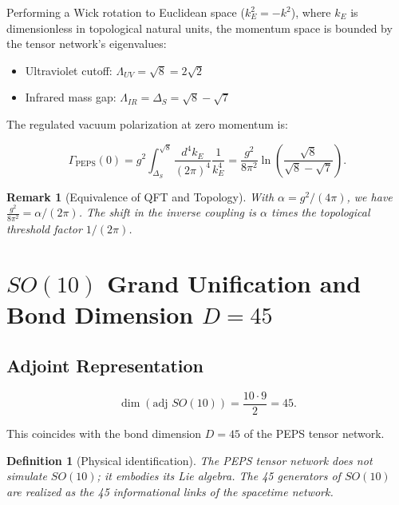 \documentclass[12pt]{article}
\newtheorem{definition}[theorem]{Definition}
\newtheorem{remark}[theorem]{Remark}
\begin{document}
Performing a Wick rotation to Euclidean space (\(k_E^2 = -k^2\)), where \(k_E\) is dimensionless in topological natural units, the momentum space is bounded by the tensor network's eigenvalues:

\begin{itemize}
  \item Ultraviolet cutoff: \(\Lambda_{UV} = \sqrt{8} = 2\sqrt{2}\)
  \item Infrared mass gap: \(\Lambda_{IR} = \Delta_S = \sqrt{8} - \sqrt{7}\)
\end{itemize}

The regulated vacuum polarization at zero momentum is:

\begin{equation}
\Gamma_{\text{PEPS}}(0) = g^2 \int_{\Delta_S}^{\sqrt{8}} \frac{d^4k_E}{(2\pi)^4} \frac{1}{k_E^4} = \frac{g^2}{8\pi^2} \ln\left(\frac{\sqrt{8}}{\sqrt{8} - \sqrt{7}}\right) .
\label{eq:gamma_finite}
\end{equation}

\begin{remark}[Equivalence of QFT and Topology]
With \(\alpha = g^2/(4\pi)\), we have \(\frac{g^2}{8\pi^2} = \alpha/(2\pi)\). The shift in the inverse coupling is \(\alpha\) times the topological threshold factor \(1/(2\pi)\).
\end{remark}

\section{$SO(10)$ Grand Unification and Bond Dimension $D=45$}

\subsection{Adjoint Representation}

\begin{equation}
\dim(\text{adj } SO(10)) = \frac{10 \cdot 9}{2} = 45 .
\label{eq:so10_dim}
\end{equation}

This coincides with the bond dimension \(D=45\) of the PEPS tensor network.

\begin{definition}[Physical identification]
The PEPS tensor network does not \textit{simulate} \(SO(10)\); it \textit{embodies} its Lie algebra. The 45 generators of \(SO(10)\) are realized as the 45 informational links of the spacetime network.
\end{definition}
\end{document}
